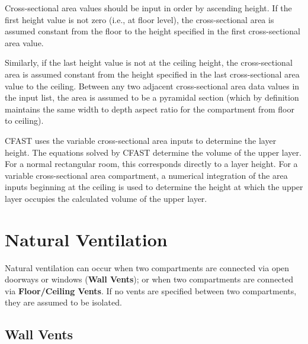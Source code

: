 Cross-sectional area values should be input in order by ascending height. If the first height value is not zero (i.e., at floor level), the cross-sectional area is assumed constant from the floor to the height specified in the first cross-sectional area value.

Similarly, if the last height value is not at the ceiling height, the cross-sectional area is assumed constant from the height specified in the last cross-sectional area value to the ceiling. Between any two adjacent cross-sectional area data values in the input list, the area is assumed to be a pyramidal section (which by definition maintains the same width to depth aspect ratio for the compartment from floor to ceiling).

CFAST uses the variable cross-sectional area inputs to determine the layer height. The equations solved by CFAST determine the volume of the upper layer. For a normal rectangular room, this corresponds directly to a layer height. For a variable cross-sectional area compartment, a numerical integration of the area inputs beginning at the ceiling is used to determine the height at which the upper layer occupies the calculated volume of the upper layer.






\chapter{Natural Ventilation}

Natural ventilation can occur when two compartments are connected via open doorways or windows (\textbf{Wall Vents}); or when two compartments are connected via \textbf{Floor/Ceiling Vents}. If no vents are specified between two compartments, they are assumed to be isolated.

\section{Wall Vents}

